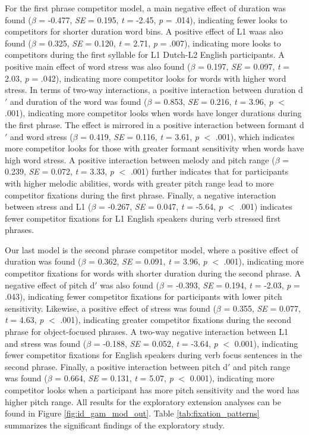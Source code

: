  For the first phrase competitor model, a main negative effect of duration was found ($\beta$ = -0.477, \textit{SE} = 0.195, \textit{t} = -2.45, \textit{p} = .014), indicating fewer looks to competitors for shorter duration word bins. A positive effect of L1 waas also found ($\beta$ = 0.325, \textit{SE} = 0.120, \textit{t} = 2.71, \textit{p} = .007), indicating more looks to competitors during the first syllable for L1 Dutch-L2 English participants. A positive main effect of word stress was also found ($\beta$ = 0.197, \textit{SE} = 0.097, \textit{t} = 2.03, \textit{p} = .042), indicating more competitor looks for words with higher word stress. In terms of two-way interactions, a positive interaction between duration d$'$ and duration of the word was found ($\beta$ = 0.853, \textit{SE} = 0.216, \textit{t} = 3.96, \textit{p} $<$ .001), indicating more competitor looks when words have longer durations during the first phrase. The effect is mirrored in a positive interaction between formant d$'$ and word stress ($\beta$ = 0.419, \textit{SE} = 0.116, \textit{t} = 3.61, \textit{p} $<$ .001), which indicates more competitor looks for those with greater formant sensitivity when words have high word stress. A positive interaction between melody and pitch range ($\beta$ = 0.239, \textit{SE} = 0.072, \textit{t} = 3.33, \textit{p} $<$ .001) further indicates that for participants with higher melodic abilities, words with greater pitch range lead to more competitor fixations during the first phrase. Finally, a negative interaction between stress and L1 ($\beta$ = -0.267, \textit{SE} = 0.047, \textit{t} = -5.64, \textit{p} $<$ .001) indicates fewer competitor fixations for L1 English speakers during verb stressed first phrases.

Our last model is the second phrase competitor model, where a positive effect of duration was found ($\beta$ = 0.362, \textit{SE} = 0.091, \textit{t} = 3.96, \textit{p} $<$ .001), indicating more competitor fixations for words with shorter duration during the second phrase. A negative effect of pitch d$'$ was also found ($\beta$ = -0.393, \textit{SE} = 0.194, \textit{t} = -2.03, \textit{p} = .043), indicating fewer competitor fixations for participants with lower pitch sensitivity. Likewise, a positive effect of stress was found ($\beta$ = 0.355, \textit{SE} = 0.077, \textit{t} = 4.63, \textit{p} $<$ .001), indicating greater competitor fixations during the second phrase for object-focused phrases. A two-way negative interaction between L1 and stress was found ($\beta$ = -0.188, \textit{SE} = 0.052, \textit{t} = -3.64, \textit{p} $<$ 0.001), indicating fewer competitor fixations for English speakers during verb focus sentences in the second phrase. Finally, a positive interaction between pitch d$'$ and pitch range was found ($\beta$ = 0.664, \textit{SE} = 0.131, \textit{t} = 5.07, \textit{p} $<$ 0.001), indicating more competitor looks when a participant has more pitch sensitivity and the word has higher pitch range. All results for the exploratory extension analyses can be found in Figure \ref{fig:id_gam_mod_out}. 
Table \ref{tab:fixation_patterns} summarizes the significant findings of the exploratory study.

